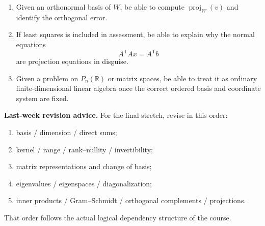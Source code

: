 \begin{examtip}[title={Final Revision Checklist: ``Given \(\cdots\), be able to \(\cdots\)''}]
\begin{enumerate}[leftmargin=*]
    \item Given an orthonormal basis of \(W\), be able to compute \(\operatorname{proj}_W(v)\) and identify the orthogonal error.

    \item If least squares is included in assessment, be able to explain why the normal equations
    \[
    A^{\mathsf T}Ax=A^{\mathsf T}b
    \]
    are projection equations in disguise.

    \item Given a problem on \(P_n(\mathbb{R})\) or matrix spaces, be able to treat it as ordinary finite-dimensional linear algebra once the correct ordered basis and coordinate system are fixed.
\end{enumerate}
\end{examtip}

\begin{policynote}
\textbf{Last-week revision advice.}
For the final stretch, revise in this order:
\begin{enumerate}[leftmargin=*]
    \item basis / dimension / direct sums;
    \item kernel / range / rank--nullity / invertibility;
    \item matrix representations and change of basis;
    \item eigenvalues / eigenspaces / diagonalization;
    \item inner products / Gram--Schmidt / orthogonal complements / projections.
\end{enumerate}
That order follows the actual logical dependency structure of the course.
\end{policynote}
